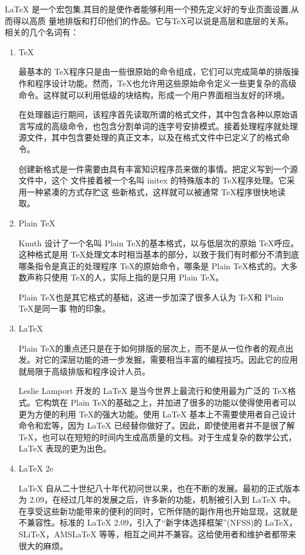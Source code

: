 \documentclass[DIV=14,fontsize=11,headinclude=false,index=totoc,footinclude=false,headings=small]{tkz-doc}
\begin{document}
\LaTeX{} 是一个宏包集,其目的是使作者能够利用一个预先定义好的专业页面设置,从而得以高质
量地排版和打印他们的作品。它与\TeX 可以说是高层和底层的关系。相关的几个名词有：

\begin{enumerate}
\item \TeX
  
  最基本的 \TeX 程序只是由一些很原始的命令组成，它们可以完成简单的排版操作和程序设计功能。然而，\TeX 也允许用这些原始命令定义一些更复杂的高级命令。这样就可以利用低级的块结构，形成一个用户界面相当友好的环境。

在处理器运行期间，该程序首先读取所谓的格式文件，其中包含各种以原始语言写成的高级命令，也包含分割单词的连字号安排模式。接着处理程序就处理源文件，其中包含要处理的真正文本，以及在格式文件中已定义了的格式命令。

创建新格式是一件需要由具有丰富知识程序员来做的事情。把定义写到一个源文件中，这个
文件接着被一个名叫 initex 的特殊版本的 \TeX 程序处理。它采用一种紧凑的方式存贮这
些新格式，这样就可以被通常 \TeX 程序很快地读取。

\item Plain \TeX

Knuth 设计了一个名叫 Plain \TeX 的基本格式，以与低层次的原始 \TeX 呼应。这种格式是用 \TeX 处理文本时相当基本的部分，以致于我们有时都分不清到底哪条指令是真正的处理程序 \TeX 的原始命令，哪条是 Plain \TeX 格式的。大多数声称只使用 \TeX 的人，实际上指的是只用 Plain \TeX 。

Plain \TeX 也是其它格式的基础，这进一步加深了很多人认为 \TeX 和 Plain \TeX 是同一事
物的印象。

\item \LaTeX{}

Plain \TeX 的重点还只是在于如何排版的层次上，而不是从一位作者的观点出发。对它的深层功能的进一步发掘，需要相当丰富的编程技巧。因此它的应用就局限于高级排版和程序设计人员。

Leslie Lamport 开发的 \LaTeX{} 是当今世界上最流行和使用最为广泛的 \TeX 格式。它构筑在 Plain \TeX 的基础之上，并加进了很多的功能以使得使用者可以更为方便的利用 \TeX 的强大功能。使用 \LaTeX{} 基本上不需要使用者自己设计命令和宏等，因为 \LaTeX{} 已经替你做好了。因此，即使使用者并不是很了解 \TeX ，也可以在短短的时间内生成高质量的文档。对于生成复杂的数学公式，\LaTeX{} 表现的更为出色。

\item \LaTeX{} 2e

\LaTeX{} 自从二十世纪八十年代初问世以来，也在不断的发展。最初的正式版本为 2.09，在经过几年的发展之后，许多新的功能，机制被引入到 \LaTeX{} 中。在享受这些新功能带来的便利的同时，它所伴随的副作用也开始显现，这就是不兼容性。标准的 \LaTeX{} 2.09，引入了“新字体选择框架”(NFSS)的 \LaTeX{}，SLiTeX，AMSLaTeX 等等，相互之间并不兼容。这给使用者和维护者都带来很大的麻烦。


\end{enumerate}
\end{document}
